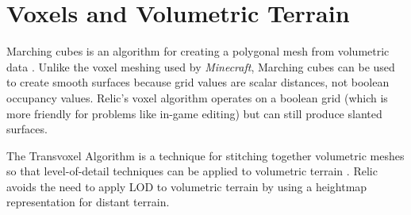 \section{Voxels and Volumetric Terrain}

Marching cubes is an algorithm for creating a polygonal mesh from volumetric data \cite{marchingcubes}.
Unlike the voxel meshing used by {\em Minecraft}, Marching cubes can be used to create smooth surfaces because grid values are scalar distances, not boolean occupancy values.
Relic's voxel algorithm operates on a boolean grid (which is more friendly for problems like in-game editing) but can still produce slanted surfaces.

The Transvoxel Algorithm is a technique for stitching together volumetric meshes so that level-of-detail techniques can be applied to volumetric terrain \cite{lengyel}.
Relic avoids the need to apply LOD to volumetric terrain by using a heightmap representation for distant terrain.








